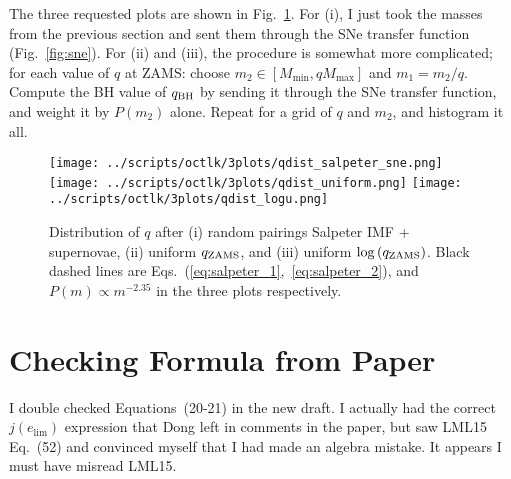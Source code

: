 \documentclass[11pt,
        usenames, %
        dvipsnames %
    ]{article}
\newcommand*{\p}[1]{\left(#1\right)}
\begin{document}
The three requested plots are shown in Fig.~\ref{fig:2}. For (i), I just took
the masses from the previous section and sent them through the SNe transfer
function (Fig.~\ref{fig:sne}). For (ii) and (iii), the procedure is somewhat
more complicated; for each value of $q$ at ZAMS\@: choose $m_2 \in [M_{\min},
qM_{\max}]$ and $m_1 = m_2 / q$. Compute the BH value of $q_{\rm BH}$ by sending
it through the SNe transfer function, and weight it by $P(m_2)$ alone. Repeat
for a grid of $q$ and $m_2$, and histogram it all.
\begin{figure}
    \centering
    \texttt{[image: ../scripts/octlk/3plots/qdist\_salpeter\_sne.png]}
    \texttt{[image: ../scripts/octlk/3plots/qdist\_uniform.png]}
    \texttt{[image: ../scripts/octlk/3plots/qdist\_logu.png]}
    \caption{Distribution of $q$ after (i) random pairings Salpeter IMF +
    supernovae, (ii) uniform $q_{\rm ZAMS}$, and (iii) uniform $\log\p{q_{\rm
    ZAMS}}$. Black dashed lines are
    Eqs.~(\ref{eq:salpeter_1},~\ref{eq:salpeter_2}), and $P(m) \propto
    m^{-2.35}$ in the three plots respectively. }\label{fig:2}
\end{figure}

\section{Checking Formula from Paper}

I double checked Equations~(20-21) in the new draft. I actually had the correct
$j(e_{\lim})$ expression that Dong left in comments in the paper, but saw LML15
Eq.~(52) and convinced myself that I had made an algebra mistake. It appears I
must have misread LML15.
\end{document}

